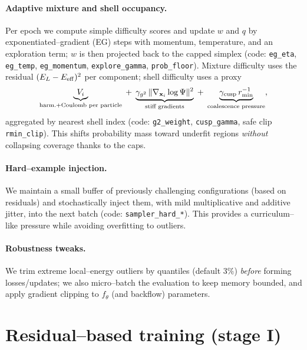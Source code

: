 \paragraph{Adaptive mixture and shell occupancy.}
Per epoch we compute simple difficulty scores and update $w$ and $q$ by exponentiated–gradient (EG) steps with momentum, temperature, and an exploration term; $w$ is then projected back to the capped simplex (code: \texttt{eg\_eta}, \texttt{eg\_temp}, \texttt{eg\_momentum}, \texttt{explore\_gamma}, \texttt{prob\_floor}). Mixture difficulty uses the residual $(E_L-E_{\rm eff})^2$ per component; shell difficulty uses a proxy
\[
\underbrace{V_i}_{\text{harm.+Coulomb per particle}}
\;+\; \underbrace{\gamma_{g^2}\,\|\nabla_{\mathbf x_i}\log\Psi\|^2}_{\text{stiff gradients}}
\;+\; \underbrace{\gamma_{\rm cusp}\,r_{\min}^{-1}}_{\text{coalescence pressure}},
\]
aggregated by nearest shell index (code: \texttt{g2\_weight}, \texttt{cusp\_gamma}, safe clip \texttt{rmin\_clip}). This shifts probability mass toward underfit regions \emph{without} collapsing coverage thanks to the caps.

\paragraph{Hard–example injection.}
We maintain a small buffer of previously challenging configurations (based on residuals) and stochastically inject them, with mild multiplicative and additive jitter, into the next batch (code: \texttt{sampler\_hard\_*}). This provides a curriculum–like pressure while avoiding overfitting to outliers.

\paragraph{Robustness tweaks.}
We trim extreme local–energy outliers by quantiles (default $3\%$) \emph{before} forming losses/updates; we also micro–batch the evaluation to keep memory bounded, and apply gradient clipping to $f_\theta$ (and backflow) parameters.

\section{Residual–based training (stage I)}
\label{sec:residual-stage}

